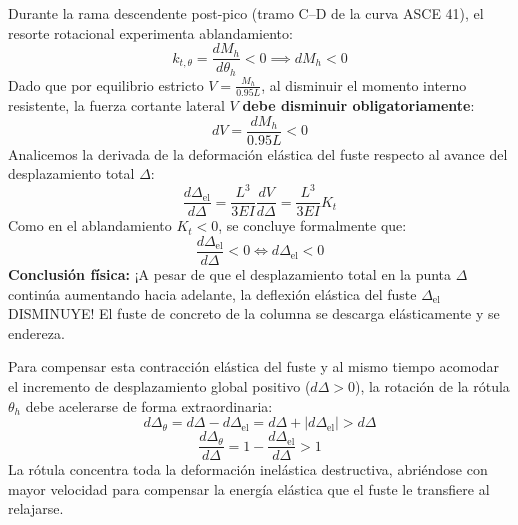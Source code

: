 \documentclass[11pt,letterpaper]{article}
\begin{document}
\begin{alertbox}
Durante la rama descendente post-pico (tramo C--D de la curva ASCE 41), el resorte rotacional experimenta ablandamiento:
\begin{equation}
k_{t,\theta} = \frac{dM_h}{d\theta_h} < 0 \implies dM_h < 0
\end{equation}
Dado que por equilibrio estricto $V = \frac{M_h}{0.95 L}$, al disminuir el momento interno resistente, la fuerza cortante lateral $V$ \textbf{debe disminuir obligatoriamente}:
\begin{equation}
dV = \frac{dM_h}{0.95 L} < 0
\end{equation}
Analicemos la derivada de la deformación elástica del fuste respecto al avance del desplazamiento total $\Delta$:
\begin{equation}
\frac{d\Delta_{\text{el}}}{d\Delta} = \frac{L^3}{3 E I} \frac{dV}{d\Delta} = \frac{L^3}{3 E I} K_t
\end{equation}
Como en el ablandamiento $K_t < 0$, se concluye formalmente que:
\begin{equation}
\frac{d\Delta_{\text{el}}}{d\Delta} < 0 \iff d\Delta_{\text{el}} < 0
\end{equation}
\textbf{Conclusión física:} ¡A pesar de que el desplazamiento total en la punta $\Delta$ continúa aumentando hacia adelante, la deflexión elástica del fuste $\Delta_{\text{el}}$ DISMINUYE! El fuste de concreto de la columna se descarga elásticamente y se endereza.
\end{alertbox}

Para compensar esta contracción elástica del fuste y al mismo tiempo acomodar el incremento de desplazamiento global positivo ($d\Delta > 0$), la rotación de la rótula $\theta_h$ debe acelerarse de forma extraordinaria:
\begin{equation}
d\Delta_{\theta} = d\Delta - d\Delta_{\text{el}} = d\Delta + |d\Delta_{\text{el}}| > d\Delta
\end{equation}
\begin{equation}
\frac{d\Delta_{\theta}}{d\Delta} = 1 - \frac{d\Delta_{\text{el}}}{d\Delta} > 1
\end{equation}
La rótula concentra toda la deformación inelástica destructiva, abriéndose con mayor velocidad para compensar la energía elástica que el fuste le transfiere al relajarse.

\end{document}
